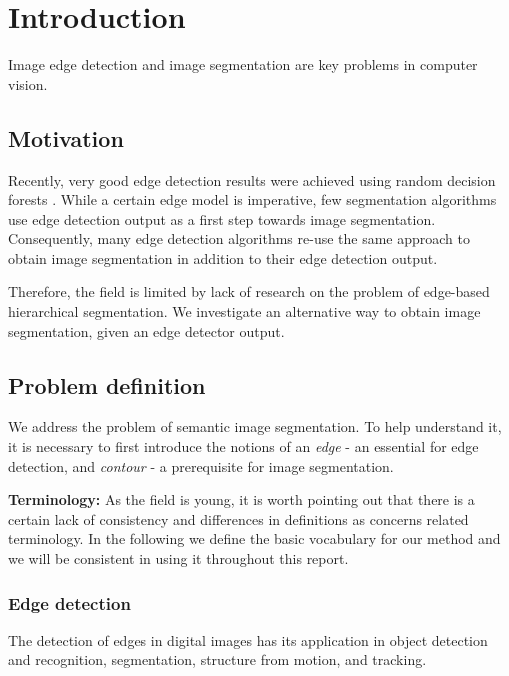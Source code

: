 \chapter{Introduction}
\label{Chapter1}
Image edge detection and image segmentation are key problems in computer vision.

\section{Motivation}
Recently, very good edge detection results were achieved using random decision forests \cite{DollarICCV13edges}. While a certain edge model is imperative, %
few segmentation algorithms use edge detection output as a first step towards %
image segmentation. Consequently, many edge detection algorithms re-use the same approach to obtain image segmentation in addition %
to their edge detection output.

Therefore, the field is limited by lack of research on the problem of edge-based hierarchical segmentation. We investigate an alternative way %
to obtain image segmentation, given an edge detector output.

\section{Problem definition}

We address the problem of semantic image segmentation. To help understand it, it is necessary to first introduce the notions of an {\it edge} - an essential for edge detection, and {\it contour} - a prerequisite for image segmentation.

\textbf{Terminology:} As the field is young, it is worth pointing out that there is a certain lack of consistency and differences in definitions as concerns related terminology. In the following we define the basic vocabulary for our method and we will be consistent in using it throughout this report.

\subsection{Edge detection}
The detection of edges in digital images has its application in %
object detection and recognition, segmentation, structure from motion, and tracking.

